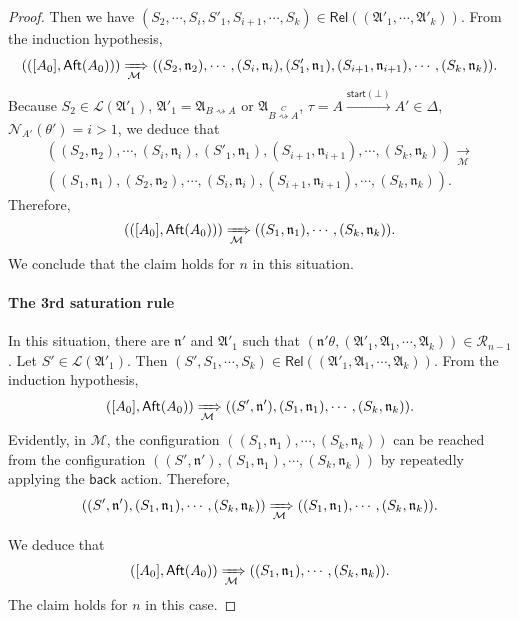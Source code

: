 \documentclass[preprint,12pt]{elsarticle}
\newcommand\Mm{{\mathcal{M} }}
\newcommand\aft{{\sf Aft}}
\newcommand\back{{\mathsf{back} }}
\newcommand\startactivity{{\mathsf{start} }}
\newcommand\namefun{\mathcal{N}}
\newcommand\aname{\mathfrak{n}}
\newcommand\AutReach{\mathscr{R}}
\newcommand\Rel{\mathsf{Rel}}
\newcommand\Aut{{\mathfrak{A} }}
\newcommand\Lang{{\mathscr{L} }}
\begin{document}
\begin{proof}
Then we have  $(S_2, \cdots, S_i, S'_1, S_{i+1}, \cdots, S_k) \in \Rel((\Aut'_1, \cdots, \Aut'_k))$.
From the induction hypothesis, 
$$(([A_0], \aft(A_0))) \xRightarrow[\Mm]{} ((S_2, \aname_2), \cdots, (S_i, \aname_i), (S'_1, \aname_1), (S_{i+1}, \aname_{i+1}), \cdots, (S_k, \aname_k)).$$ 
%
Because $S_2 \in \Lang(\Aut'_1)$, $\Aut'_1 = \Aut_{B \rightsquigarrow A}$ or $\Aut_{B \stackrel{C}{\rightsquigarrow} A}$, $\tau = A \xrightarrow{\startactivity(\bot)} A'  \in \Delta$, $\namefun_{A'}(\theta') = i > 1$, we deduce that 
$$
\begin{array}{l}
((S_2, \aname_2), \cdots, (S_i, \aname_i), (S'_1, \aname_1), (S_{i+1}, \aname_{i+1}), \cdots, (S_k, \aname_k)) \xrightarrow[\Mm]{} \\
((S_1, \aname_1), (S_2, \aname_2), \cdots, (S_i, \aname_i), (S_{i+1}, \aname_{i+1}), \cdots, (S_k, \aname_k)).
\end{array}
$$
Therefore, 
$$
\begin{array}{l}
(([A_0], \aft(A_0))) \xRightarrow[\Mm]{} ((S_1, \aname_1), \cdots, (S_k, \aname_k)).
\end{array}
$$
We conclude that the claim holds for $n$ in this situation.

\paragraph*{The 3rd saturation rule} In this situation, there are $\aname'$ and $\Aut'_1$ such that $(\aname' \theta, (\Aut'_1, \Aut_1, \cdots, \Aut_k)) \in \AutReach_{n-1}$.
Let $S' \in \Lang(\Aut'_1)$. Then $(S', S_1, \cdots, S_k) \in \Rel((\Aut'_1, \Aut_1, \cdots, \Aut_k))$. From the induction hypothesis, 
\[([A_0], \aft(A_0)) \xRightarrow[\Mm]{} ((S', \aname'), (S_1, \aname_1), \cdots, (S_k, \aname_k)). \]
Evidently, in $\Mm$, the configuration $((S_1, \aname_1), \cdots, (S_k, \aname_k))$ can be reached from the configuration $((S', \aname'), (S_1, \aname_1), \cdots, (S_k, \aname_k))$ by repeatedly applying the $\back$ action. Therefore, 
\[ ((S', \aname'), (S_1, \aname_1), \cdots, (S_k, \aname_k))  \xRightarrow[\Mm]{} ((S_1, \aname_1), \cdots, (S_k, \aname_k)). \]

We deduce that 
 \[([A_0], \aft(A_0)) \xRightarrow[\Mm]{} ((S_1, \aname_1), \cdots, (S_k, \aname_k)). \]
 The claim holds for $n$ in this case. 
 

\end{proof}
\end{document}
